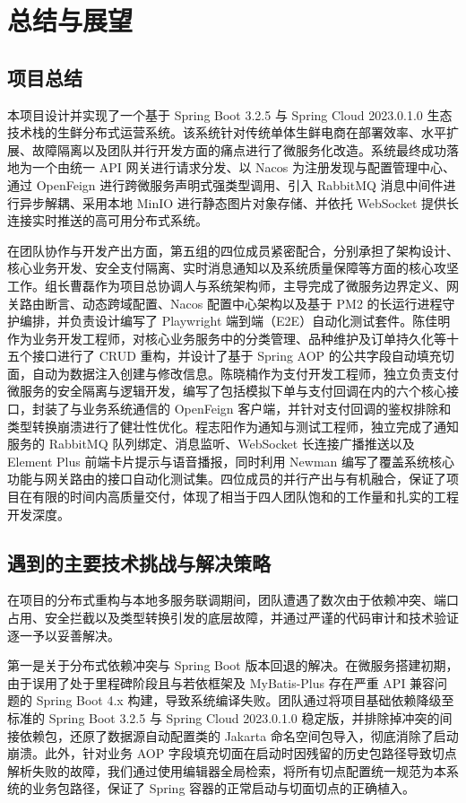 
\chapter{总结与展望}

\section{项目总结}

本项目设计并实现了一个基于 Spring Boot 3.2.5 与 Spring Cloud 2023.0.1.0 生态技术栈的生鲜分布式运营系统。该系统针对传统单体生鲜电商在部署效率、水平扩展、故障隔离以及团队并行开发方面的痛点进行了微服务化改造。系统最终成功落地为一个由统一 API 网关进行请求分发、以 Nacos 为注册发现与配置管理中心、通过 OpenFeign 进行跨微服务声明式强类型调用、引入 RabbitMQ 消息中间件进行异步解耦、采用本地 MinIO 进行静态图片对象存储、并依托 WebSocket 提供长连接实时推送的高可用分布式系统。

在团队协作与开发产出方面，第五组的四位成员紧密配合，分别承担了架构设计、核心业务开发、安全支付隔离、实时消息通知以及系统质量保障等方面的核心攻坚工作。组长曹磊作为项目总协调人与系统架构师，主导完成了微服务边界定义、网关路由断言、动态跨域配置、Nacos 配置中心架构以及基于 PM2 的长运行进程守护编排，并负责设计编写了 Playwright 端到端（E2E）自动化测试套件。陈佳明作为业务开发工程师，对核心业务服务中的分类管理、品种维护及订单持久化等十五个接口进行了 CRUD 重构，并设计了基于 Spring AOP 的公共字段自动填充切面，自动为数据注入创建与修改信息。陈晓楠作为支付开发工程师，独立负责支付微服务的安全隔离与逻辑开发，编写了包括模拟下单与支付回调在内的六个核心接口，封装了与业务系统通信的 OpenFeign 客户端，并针对支付回调的鉴权排除和类型转换崩溃进行了健壮性优化。程志阳作为通知与测试工程师，独立完成了通知服务的 RabbitMQ 队列绑定、消息监听、WebSocket 长连接广播推送以及 Element Plus 前端卡片提示与语音播报，同时利用 Newman 编写了覆盖系统核心功能与网关路由的接口自动化测试集。四位成员的并行产出与有机融合，保证了项目在有限的时间内高质量交付，体现了相当于四人团队饱和的工作量和扎实的工程开发深度。

\section{遇到的主要技术挑战与解决策略}

在项目的分布式重构与本地多服务联调期间，团队遭遇了数次由于依赖冲突、端口占用、安全拦截以及类型转换引发的底层故障，并通过严谨的代码审计和技术验证逐一予以妥善解决。

第一是关于分布式依赖冲突与 Spring Boot 版本回退的解决。在微服务搭建初期，由于误用了处于里程碑阶段且与若依框架及 MyBatis-Plus 存在严重 API 兼容问题的 Spring Boot 4.x 构建，导致系统编译失败。团队通过将项目基础依赖降级至标准的 Spring Boot 3.2.5 与 Spring Cloud 2023.0.1.0 稳定版，并排除掉冲突的间接依赖包，还原了数据源自动配置类的 Jakarta 命名空间包导入，彻底消除了启动崩溃。此外，针对业务 AOP 字段填充切面在启动时因残留的历史包路径导致切点解析失败的故障，我们通过使用编辑器全局检索，将所有切点配置统一规范为本系统的业务包路径，保证了 Spring 容器的正常启动与切面切点的正确植入。

